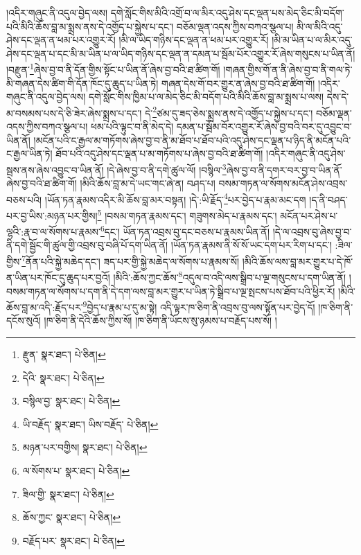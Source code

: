 །འདིར་གཞུང་ནི་འདུལ་བྱེད་ལས། དགེ་སློང་གིས་མིའི་འགྲོ་བ་ལ་མིར་འདུ་ཤེས་དང་ལྡན་པས་མེད་ཅིང་མི་བདོག་པའི་མིའི་ཆོས་བླ་མ་སྨྲས་ནས་དེ་འགྱོད་པ་སྐྱེས་པ་དང་། བཅོམ་ལྡན་འདས་ཀྱིས་བཀའ་སྩལ་པ། མི་ལ་མིའི་འདུ་ཤེས་དང་ལྡན་ན་ཕམ་པར་འགྱུར་རོ། །མི་ལ་ཡིད་གཉིས་དང་ལྡན་ན་ཕམ་པར་འགྱུར་རོ། །མི་མ་ཡིན་པ་ལ་མིར་འདུ་ཤེས་དང་ལྡན་པ་དང་མི་མ་ཡིན་པ་ལ་ཡིད་གཉིས་དང་ལྡན་ན་དམན་པ་སྦོམ་པོར་འགྱུར་རོ་ཞེས་གསུངས་པ་ཡིན་ནོ། །བརྫུན་\footnote{རྫུན་  སྣར་ཐང་།  པེ་ཅིན། }ཞེས་བྱ་བ་ནི་དོན་གྱིས་སྟོང་པ་ཡིན་ནོ་ཞེས་བྱ་བའི་ཐ་ཚིག་གོ། །གཞན་གྱིས་གོ་ན་ནི་ཞེས་བྱ་བ་ནི་གལ་ཏེ་མི་གཞན་དེས་ཚིག་གི་དོན་ཁོང་དུ་ཆུད་པ་ཡིན་ཏེ། གཞན་དེས་གོ་བར་གྱུར་ན་ཞེས་བྱ་བའི་ཐ་ཚིག་གོ། །འདིར་གཞུང་ནི་འདུལ་བྱེད་ལས། དགེ་སློང་གིས་ཁྱིམ་པ་ལ་མེད་ཅིང་མི་བདོག་པའི་མིའི་ཆོས་བླ་མ་སྨྲས་པ་ལས། དེས་དེ་མ་བསམས་པས་དེ་ཅི་ཟེར་ཞེས་སྨྲས་པ་དང་། དེ་\footnote{དེའི་  སྣར་ཐང་།  པེ་ཅིན། }ཙམ་དུ་ཟད་ཅེས་སྨྲས་ནས་དེ་འགྱོད་པ་སྐྱེས་པ་དང་། བཅོམ་ལྡན་འདས་ཀྱིས་བཀའ་སྩལ་པ། ཕམ་པའི་ལྟུང་བ་ནི་མེད་དེ། དམན་པ་སྦོམ་བོར་འགྱུར་རོ་ཞེས་བྱ་བའི་བར་དུ་འབྱུང་བ་ཡིན་ནོ། །མངོན་པའི་ང་རྒྱལ་མ་གཏོགས་ཞེས་བྱ་བ་ནི་མ་ཐོབ་པ་ཐོབ་པའི་འདུ་ཤེས་དང་ལྡན་པ་ཉིད་ནི་མངོན་པའི་ང་རྒྱལ་ཡིན་ཏེ། ཐོབ་པའི་འདུ་ཤེས་དང་ལྡན་པ་མ་གཏོགས་པ་ཞེས་བྱ་བའི་ཐ་ཚིག་གོ། །འདིར་གཞུང་ནི་འདུ་ཤེས་སྦས་ནས་ཞེས་འབྱུང་བ་ཡིན་ནོ། །དེ་ཞེས་བྱ་བ་ནི་དགེ་ཚུལ་ལོ། །བསྙིལ་\footnote{བསྙིལ་བྱ་  སྣར་ཐང་།  པེ་ཅིན། }ཞེས་བྱ་བ་ནི་དགར་བར་བྱ་བ་ཡིན་ནོ་ཞེས་བྱ་བའི་ཐ་ཚིག་གོ། །མིའི་ཆོས་བླ་མ་དེ་ཡང་གང་ཞེ་ན། བཤད་པ། བསམ་གཏན་ལ་སོགས་མངོན་ཤེས་འབྲས་བཅས་པའི། །ཡོན་ཏན་རྣམས་འདིར་མི་ཆོས་བླ་མར་བསྟན། །དེ་:ཡི་རྗོད་\footnote{ཡི་བརྗོད་  སྣར་ཐང་། ཡིས་བརྗོད་  པེ་ཅིན། }པར་བྱེད་པ་རྣམ་མང་དག །ད་ནི་བཤད་པར་བྱ་ཡིས་:མཉན་པར་གྱིས།\footnote{མཉན་པར་བགྱིས།  སྣར་ཐང་།  པེ་ཅིན། } །བསམ་གཏན་རྣམས་དང་། གཟུགས་མེད་པ་རྣམས་དང་། མངོན་པར་ཤེས་པ་ལྷའི་:རྣ་བ་ལ་སོགས་པ་རྣམས་\footnote{ལ་སོགས་པ་  སྣར་ཐང་།  པེ་ཅིན། }དང་། ཡོན་ཏན་འབྲས་བུ་དང་བཅས་པ་རྣམས་ཡིན་ནོ། །དེ་ལ་འབྲས་བུ་ཞེས་བྱ་བ་ནི་དགེ་སྦྱོང་གི་ཚུལ་གྱི་འབྲས་བུ་བཞི་པོ་དག་ཡིན་ནོ། །ཡོན་ཏན་རྣམས་ནི་སོ་སོ་ཡང་དག་པར་རིག་པ་དང་། :ཟིལ་གྱིས་\footnote{ཟིལ་གྱི་  སྣར་ཐང་།  པེ་ཅིན། }ནོན་པའི་སྐྱེ་མཆེད་དང་། ཟད་པར་གྱི་སྐྱེ་མཆེད་ལ་སོགས་པ་རྣམས་སོ། །མིའི་ཆོས་ལས་བླ་མར་གྱུར་པ་དེ་ཁོ་ན་ཡིན་པར་ཁོང་དུ་ཆུད་པར་བྱའོ། །མིའི་:ཆོས་ཀྱང་ཆོས་\footnote{ཆོས་ཀྱང་  སྣར་ཐང་།  པེ་ཅིན། }འདུལ་བ་འདི་ལས་སྒྲིབ་པ་ལྔ་གསུངས་པ་དག་ཡིན་ནོ། །བསམ་གཏན་ལ་སོགས་པ་དག་ནི་དེ་དག་ལས་བླ་མར་གྱུར་པ་ཡིན་ཏེ་སྒྲིབ་པ་ལྔ་སྤངས་པས་ཐོབ་པའི་ཕྱིར་རོ། །མིའི་ཆོས་བླ་མ་འདི་:རྗོད་པར་\footnote{བརྗོད་པར་  སྣར་ཐང་།  པེ་ཅིན། }བྱེད་པ་རྣམ་པ་དུ་མ་སྟེ། འདི་ལྟར་ཁ་ཅིག་ནི་འབྲས་བུ་ལས་སྟོན་པར་བྱེད་དོ། །ཁ་ཅིག་ནི་དངོས་སུའོ། །ཁ་ཅིག་ནི་དེའི་ཆོས་ཀྱིས་སོ། །ཁ་ཅིག་ནི་ཡོངས་སུ་ཉམས་པ་བརྗོད་པས་སོ། །
